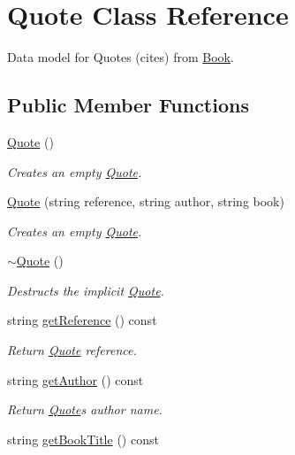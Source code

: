 \hypertarget{class_quote}{}\section{Quote Class Reference}
\label{class_quote}


Data model for Quotes (cites) from \hyperlink{class_book}{Book}.  


\subsection*{Public Member Functions}
\begin{DoxyCompactItemize}
\item 
\hyperlink{class_quote_ae160077e513fe6346eeba294a195038b}{Quote} ()
\begin{DoxyCompactList}\small\item\em Creates an empty \hyperlink{class_quote}{Quote}. \end{DoxyCompactList}\item 
\hyperlink{class_quote_a12fee26be3fcdf003691e394f256b2c8}{Quote} (string reference, string author, string book)
\begin{DoxyCompactList}\small\item\em Creates an empty \hyperlink{class_quote}{Quote}. \end{DoxyCompactList}\item 
\hyperlink{class_quote_a9b4324f3ee83827f2445177c8301482b}{$\sim$\+Quote} ()
\begin{DoxyCompactList}\small\item\em Destructs the implicit \hyperlink{class_quote}{Quote}. \end{DoxyCompactList}\item 
string \hyperlink{class_quote_a4f45d290d8b4d8ebfdf6981b754ec7b7}{get\+Reference} () const 
\begin{DoxyCompactList}\small\item\em Return \hyperlink{class_quote}{Quote} reference. \end{DoxyCompactList}\item 
string \hyperlink{class_quote_ae29855dc6393689277a9cac61f9f56b8}{get\+Author} () const 
\begin{DoxyCompactList}\small\item\em Return \hyperlink{class_quote}{Quote}\textquotesingle{}s author name. \end{DoxyCompactList}\item 
string \hyperlink{class_quote_a7089d3cf82409928bcdfca5c259facde}{get\+Book\+Title} () const 

\end{DoxyCompactItemize}
